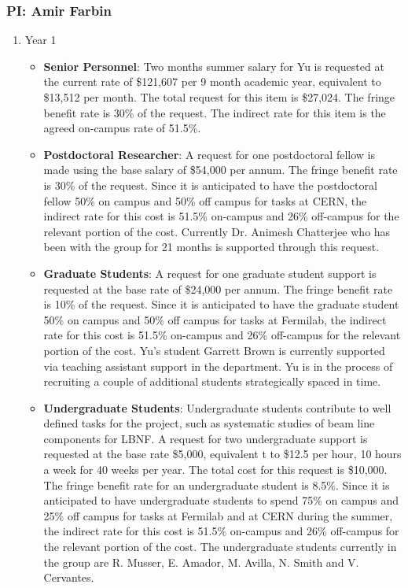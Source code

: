 \subsubsection{\bf PI: Amir Farbin}

\begin{enumerate}

\item{Year 1}
\begin{itemize}
\item{{\bf Senior Personnel}: Two months summer salary for Yu is requested at the current rate of \$121,607 per 9 month academic year, equivalent to \$13,512 per month.  The total request for this item is \$27,024.   The fringe benefit rate is 30\% of the request.  The indirect rate for this item is the agreed on-campus rate of 51.5\%.}

\item {{\bf Postdoctoral Researcher}: A request for one postdoctoral fellow is made using the base salary of \$54,000 per annum.  The fringe benefit rate is 30\% of the request.  Since it is anticipated to have the postdoctoral fellow 50\% on campus and 50\% off campus for tasks at CERN, the indirect rate for this cost is 51.5\% on-campus and 26\% off-campus for the relevant portion of the cost.  Currently Dr. Animesh Chatterjee who has been with the group for 21 months is supported through this request.} 

\item{{\bf Graduate Students}: A request for one graduate student support is requested at the base rate of \$24,000 per annum.   The fringe benefit rate is 10\% of the request.  Since it is anticipated to have the graduate student 50\% on campus and 50\% off campus for tasks at Fermilab, the indirect rate for this cost is 51.5\% on-campus and 26\% off-campus for the relevant portion of the cost.   Yu’s student Garrett Brown is currently supported via teaching assistant support in the department.   Yu is in the process of recruiting a couple of additional students strategically spaced in time. }

\item {{\bf Undergraduate Students}: Undergraduate students contribute to well defined tasks for the project, such as systematic studies of beam line components for LBNF.  A request for two undergraduate support is requested at the base rate \$5,000, equivalent t to \$12.5 per hour, 10 hours a week for 40 weeks per year.  The total cost for this request is \$10,000.  The fringe benefit rate for an undergraduate student is 8.5\%.  Since it is anticipated to have undergraduate students to spend 75\% on campus and 25\% off campus for tasks at Fermilab and at CERN during the summer, the indirect rate for this cost is 51.5\% on-campus and 26\% off-campus for the relevant portion of the cost.   The undergraduate students currently in the group are R. Musser,  E. Amador, M. Avilla, N. Smith and V. Cervantes.}


\end{itemize}
\end{enumerate}
